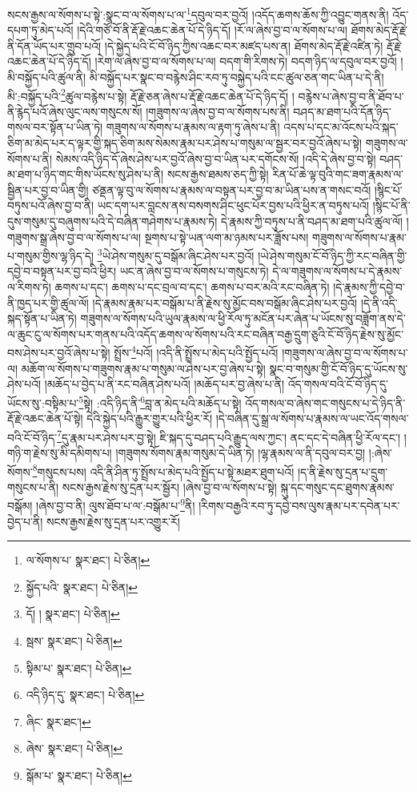 སངས་རྒྱས་ལ་སོགས་པ་སྟེ་:སྣང་བ་ལ་སོགས་པ་ལ་\footnote{ལ་སོགས་པ་  སྣར་ཐང་།  པེ་ཅིན། }དབུལ་བར་བྱའོ། །འདོད་ཆགས་ཆོས་ཀྱི་འབྱུང་གནས་ནི། འོད་དཔག་ཏུ་མེད་པའོ། །དེའི་གཙོ་བོ་ནི་རྡོ་རྗེ་འཆང་ཆེན་པོ་དེ་ཉིད་དོ། །རོ་ལ་ཞེས་བྱ་བ་ལ་སོགས་པ་ལ། ཐོགས་མེད་རྡོ་རྗེ་ནི་དོན་ཡོད་པར་གྲུབ་པའོ། །དེ་སྐྱེད་པའི་ངོ་བོ་ཉིད་ཀྱིས་འཆང་བར་མཛད་པས་ན། ཐོགས་མེད་རྡོ་རྗེ་འཛིན་ཏེ། རྡོ་རྗེ་འཆང་ཆེན་པོ་དེ་ཉིད་དོ། །རེག་ལ་ཞེས་བྱ་བ་ལ་སོགས་པ་ལ། བདག་གི་རིགས་ཏེ། བདག་ཉིད་ལ་དབུལ་བར་བྱའོ། །མི་བསྐྱོད་པའི་ཚུལ་ནི། མི་བསྐྱོད་པར་སྣང་བ་བརྙེས་ཤིང་རབ་ཏུ་བསྐྱེད་པའི་ངང་ཚུལ་ཅན་གང་ཡིན་པ་དེ་ནི། མི་:བསྐྱོད་པའི་\footnote{སྐྱོད་པའི་  སྣར་ཐང་།  པེ་ཅིན། }ཚུལ་བརྙེས་པ་སྟེ། རྡོ་རྗེ་ཅན་ཞེས་པ་རྡོ་རྗེ་འཆང་ཆེན་པོ་དེ་ཉིད་དོ། །
བརྙེས་པ་ཞེས་བྱ་བ་ནི་ཐོབ་པ་ནི་རྙེད་པའོ་ཞེས་ལུང་ལས་གསུངས་སོ། །གཟུགས་ལ་ཞེས་བྱ་བ་ལ་སོགས་པས་ནི། བཤད་མ་ཐག་པའི་དོན་ཉིད་གསལ་བར་སྟོན་པ་ཡིན་ཏེ། གཟུགས་ལ་སོགས་པ་རྣམས་ལ་རྟག་ཏུ་ཞེས་པ་ནི། འདས་པ་དང་མ་འོངས་པའི་སྐད་ཅིག་མ་མེད་པར་ད་ལྟར་གྱི་སྐད་ཅིག་མས་སེམས་རྣམ་པར་ཤེས་པ་གསུམ་ལ་སྦྱར་བར་བྱའོ་ཞེས་པ་སྟེ། གཟུགས་ལ་སོགས་པ་ནི། སེམས་འདི་ཉིད་དོ་ཞེས་ཤེས་པར་བྱའོ་ཞེས་བྱ་བ་ཡིན་པར་དགོངས་སོ། །འདི་དེ་ཞེས་བྱ་བ་སྟེ། བཤད་མ་ཐག་པ་ཉིད་གང་གིས་ཡོངས་སུ་ཤེས་པ་ནི། སངས་རྒྱས་ཐམས་ཅད་ཀྱི་སྟེ། རིན་པོ་ཆེ་ལྟ་བུའི་གང་ཟག་རྣམས་ལ་སྦྱིན་པར་བྱ་བ་ཡིན་གྱི། ཙནྡན་ལྟ་བུ་ལ་སོགས་པ་རྣམས་ལ་བསྟན་པར་བྱ་བ་མ་ཡིན་པས་ན་གསང་བའོ། །སྙིང་པོ་བཏུས་པའོ་ཞེས་བྱ་བ་ནི། ཡང་དག་པར་བླངས་ནས་བསགས་ཤིང་ཕུང་པོར་བྱས་པའི་ཕྱིར་ན་བཏུས་པའོ། །སྙིང་པོ་ནི་དུས་གསུམ་དུ་བཞུགས་པའི་དེ་བཞིན་གཤེགས་པ་རྣམས་ཏེ། དེ་རྣམས་ཀྱི་བཏུས་པ་ནི་བཤད་མ་ཐག་པའི་ཚུལ་ལོ། །གཟུགས་སྒྲ་ཞེས་བྱ་བ་ལ་སོགས་པ་ལ། སྔགས་པ་སྟེ་ཡན་ལག་མ་ཉམས་པར་ཟློས་པས། གཟུགས་ལ་སོགས་པ་རྣམ་པ་གསུམ་གྱིས་ལྷ་ཉིད་དེ། \footnote{དོ། །   སྣར་ཐང་།  པེ་ཅིན། }ཡེ་ཤེས་གསུམ་དུ་བསྒོམ་ཞིང་ཤེས་པར་བྱའོ། །ཡེ་ཤེས་གསུམ་ངོ་བོ་ཉིད་ཀྱི་རང་བཞིན་གྱི་དབྱེ་བ་བསྟན་པར་བྱ་བའི་ཕྱིར། ཡང་ན་ཞེས་བྱ་བ་ལ་སོགས་པ་གསུངས་ཏེ། དེ་ལ་གཟུགས་ལ་སོགས་པ་དེ་རྣམས་ལ་རིགས་ཏེ། ཆགས་པ་དང་། ཆགས་པ་དང་བྲལ་བ་དང་། ཆགས་པ་བར་མའི་རང་བཞིན་ཏེ། །དེ་རྣམས་ཀྱི་དབྱེ་བ་ནི་ཁྱད་པར་གྱི་ཚུལ་ལོ། །དེ་རྣམས་རྣམ་པར་བསྒོམ་པ་ནི་རྗེས་སུ་མྱོང་བས་བསྒོམ་ཞིང་ཤེས་པར་བྱའོ། །དེ་ནི་འདི་སྐད་སྟོན་པ་ཡིན་ཏེ། གཟུགས་ལ་སོགས་པའི་ཡུལ་རྣམས་ལ་ཕྱི་རོལ་ཏུ་མངོན་པར་ཞེན་པ་ཡོངས་སུ་བཟློག་ནས་དེ་ལ་ཆུང་ངུ་ལ་སོགས་པར་གནས་པའི་འདོད་ཆགས་ལ་སོགས་པའི་རང་བཞིན་བརྒྱ་དྲུག་ཅུའི་ངོ་བོ་ཉིད་རྗེས་སུ་མྱོང་བས་ཤེས་པར་བྱའོ་ཞེས་པ་སྟེ། སྤྲོས་\footnote{སྦས་  སྣར་ཐང་།  པེ་ཅིན། }པའོ། །འདི་ནི་སྤྲོས་པ་མེད་པའི་སྤྱོད་པའོ། །གཟུགས་ལ་ཞེས་བྱ་བ་ལ་སོགས་པ་ལ། མཆོག་ལ་སོགས་པ་གཟུགས་རྣམ་པ་གསུམ་ལ་ཤེས་པར་བྱ་ཞེས་པ་སྟེ། སྣང་བ་གསུམ་གྱི་ངོ་བོ་ཉིད་དུ་ཡོངས་སུ་ཤེས་པའོ། །མཆོད་པ་བྱེད་པ་ནི་རང་བཞིན་ཤེས་པའོ། །མཆོད་པར་བྱ་ཞེས་པ་ནི། འོད་གསལ་བའི་ངོ་བོ་ཉིད་དུ་ཡོངས་སུ་:བསྟིམ་པ་\footnote{སྟིམ་པ་  སྣར་ཐང་།  པེ་ཅིན། }སྟེ། :འདི་ཉིད་ནི་\footnote{འདི་ཉིད་དུ་  སྣར་ཐང་།  པེ་ཅིན། }བླ་ན་མེད་པའི་མཆོད་པ་སྟེ། འོད་གསལ་བ་ཞེས་གང་གསུངས་པ་དེ་ཉིད་ནི་རྡོ་རྗེ་འཆང་ཆེན་པོ་སྟེ། དེའི་སྐྱེད་པའི་རྒྱུར་གྱུར་པའི་ཕྱིར་རོ། །དེ་བཞིན་དུ་སྒྲ་ལ་སོགས་པ་རྣམས་ལ་ཡང་འོད་གསལ་བའི་ངོ་བོ་ཉིད་\footnote{ཞིང་  སྣར་ཐང་། }དུ་རྣམ་པར་ཤེས་པར་བྱ་སྟེ། ཇི་སྐད་དུ་བཤད་པའི་རྒྱུད་ལས་ཀྱང་། ནང་དང་དེ་བཞིན་ཕྱི་རོལ་དང་། །གཉི་ག་རྗེས་སུ་མི་དམིགས་པ། །གཟུགས་སོགས་རྣམ་གསུམ་དེ་ཡིན་ཏེ། །ལྷ་རྣམས་ལ་ནི་དབུལ་བར་བྱ། །:ཞེས་སོགས་\footnote{ཞེས་  སྣར་ཐང་།  པེ་ཅིན། }གསུངས་པས། འདི་ནི་ཤིན་ཏུ་སྤྲོས་པ་མེད་པའི་སྤྱོད་པ་སྟེ་མཐར་ཐུག་པའོ། །ད་ནི་རྗེས་སུ་དྲན་པ་དྲུག་གསུངས་པ་ནི། སངས་རྒྱས་རྗེས་སུ་དྲན་པར་སྦྱོར། །ཞེས་བྱ་བ་ལ་སོགས་པ་སྟེ། སྐུ་དང་གསུང་དང་ཐུགས་རྣམས་བསྒོམ། །ཞེས་བྱ་བ་ནི། ལུས་ཐོབ་པ་ལ་:བསྒོམ་པ་\footnote{སྒོམ་པ་  སྣར་ཐང་།  པེ་ཅིན། }ནི། །རིགས་བརྒྱའི་རབ་ཏུ་དབྱེ་བས་ལུས་རྣམ་པར་དབེན་པར་བྱེད་པ་ནི། སངས་རྒྱས་རྗེས་སུ་དྲན་པར་འགྱུར་རོ། 